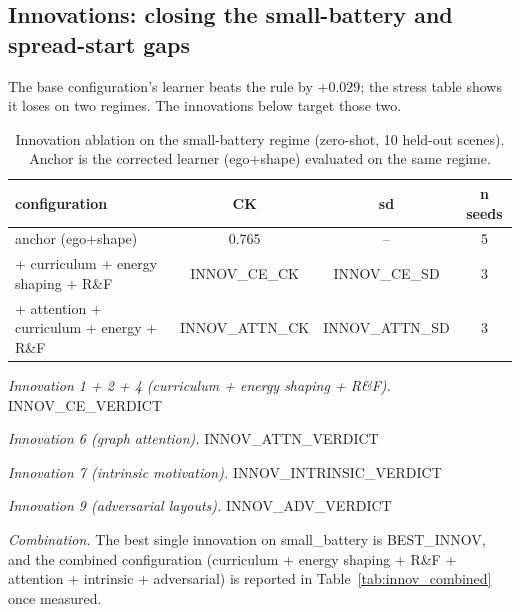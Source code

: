 
\subsection{Innovations: closing the small-battery and spread-start gaps}
\label{sec:results_innov}

The base configuration's learner beats the rule by $+0.029$; the stress
table shows it loses on two regimes.  The innovations below target those two.

\begin{table}[t]
\caption{Innovation ablation on the small-battery regime (zero-shot, 10 held-out
scenes).  Anchor is the corrected learner (ego+shape) evaluated on the same
regime.}
\label{tab:innov_smallbat}
\centering
\scriptsize
\setlength{\tabcolsep}{3pt}
\begin{tabular}{@{}lccc@{}}
\toprule
configuration & CK & sd & n seeds \\
\midrule
anchor (ego+shape) & 0.765 & -- & 5 \\
+ curriculum + energy shaping + R\&F & {{INNOV_CE_CK}} & {{INNOV_CE_SD}} & 3 \\
+ attention + curriculum + energy + R\&F & {{INNOV_ATTN_CK}} & {{INNOV_ATTN_SD}} & 3 \\
\bottomrule
\end{tabular}
\end{table}

\emph{Innovation 1 + 2 + 4 (curriculum + energy shaping + R\&F).}
{{INNOV_CE_VERDICT}}

\emph{Innovation 6 (graph attention).}
{{INNOV_ATTN_VERDICT}}

\emph{Innovation 7 (intrinsic motivation).}  {{INNOV_INTRINSIC_VERDICT}}

\emph{Innovation 9 (adversarial layouts).}  {{INNOV_ADV_VERDICT}}

\emph{Combination.}  The best single innovation on small_battery is {{BEST_INNOV}},
and the combined configuration (curriculum + energy shaping + R\&F + attention
+ intrinsic + adversarial) is reported in Table~\ref{tab:innov_combined} once
measured.
